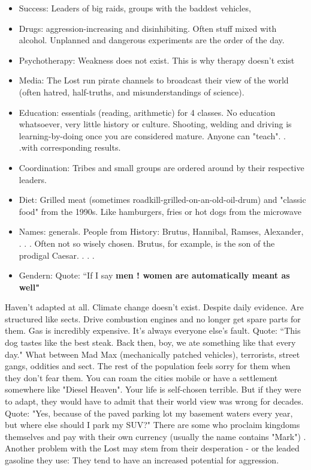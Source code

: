\begin{itemize}
    \item Success: Leaders of big raids, groups with the baddest vehicles,
    \item Drugs: aggression-increasing and disinhibiting. Often stuff mixed with alcohol. Unplanned and dangerous experiments are the order of the day.
    \item Psychotherapy: Weakness does not exist. This is why therapy doesn't exist
    \item Media: The Lost run pirate channels to broadcast their view of the world (often hatred, half-truths, and misunderstandings of science).
    \item Education: essentials (reading, arithmetic) for 4 classes. No education whatsoever, very little history or culture. Shooting, welding and driving is learning-by-doing once you are considered mature. Anyone can "teach". . .with corresponding results.
    \item Coordination: Tribes and small groups are ordered around by their respective leaders.
    \item Diet: Grilled meat (sometimes roadkill-grilled-on-an-old-oil-drum) and "classic food" from the 1990s. Like hamburgers, fries or hot dogs from the microwave
    \item Names: generals. People from History: Brutus, Hannibal, Ramses, Alexander, . . . Often not so wisely chosen. Brutus, for example, is the son of the prodigal Caesar. . . .
    \item Gendern: Quote: “If I say \bf{men !} women are automatically meant as well"

\end{itemize}

Haven't adapted at all. Climate change doesn't exist. Despite daily evidence. Are structured like sects. Drive combustion engines and no longer get spare parts for them. Gas is incredibly expensive. It's always everyone else's fault. Quote: “This dog tastes like the best steak. Back then, boy, we ate something like that every day." What between Mad Max (mechanically patched vehicles), terrorists, street gangs, oddities and sect. The rest of the population feels sorry for them when they don't fear them. You can roam the cities mobile or have a settlement somewhere like "Diesel Heaven". Your life is self-chosen terrible. But if they were to adapt, they would have to admit that their world view was wrong for decades. Quote: "Yes, because of the paved parking lot my basement waters every year, but where else should I park my SUV?" There are some who proclaim kingdoms themselves and pay with their own currency (usually the name contains "Mark") . Another problem
with the Lost may stem from their desperation - or the leaded gasoline they use: They tend to have an increased potential for aggression.


